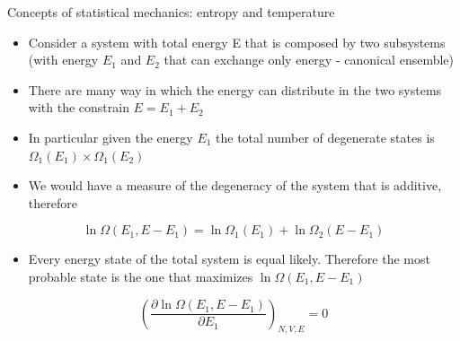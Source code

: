 \documentclass{beamer}
\begin{document}
\begin{frame}{Concepts of statistical mechanics: entropy and temperature \cite{frenkel2001understanding}}
\begin{itemize}
\item Consider a system with total energy E that is composed by two subsystems (with energy $E_{1}$ and $E_{2}$ that can exchange only energy - canonical ensemble) 
\item There are many way in which the energy can distribute in the two systems with the constrain $E=E_{1}+E_{2}$
\item In particular given the energy $E_{1}$ the total number of degenerate states is $\Omega_{1}(E_{1})\times\Omega_{1}(E_{2}) $
\item We would have a measure of the degeneracy of the system that is additive, therefore 
\end{itemize}
\begin{equation*}
\ln\Omega(E_{1},E-E_{1})=\ln\Omega_{1}(E_{1})+\ln\Omega_{2}(E-E_{1})
\end{equation*}
\begin{itemize}
\item Every energy state of the total system is equal likely. Therefore the most probable state is the one that maximizes $\ln \Omega(E_{1},E-E_{1})$
\end{itemize}
\begin{equation*}
\left( \frac{\partial \ln \Omega(E_{1},E-E_{1})}{\partial E_{1}} \right)_{N,V,E}=0
\end{equation*}
\end{frame}
\end{document}

